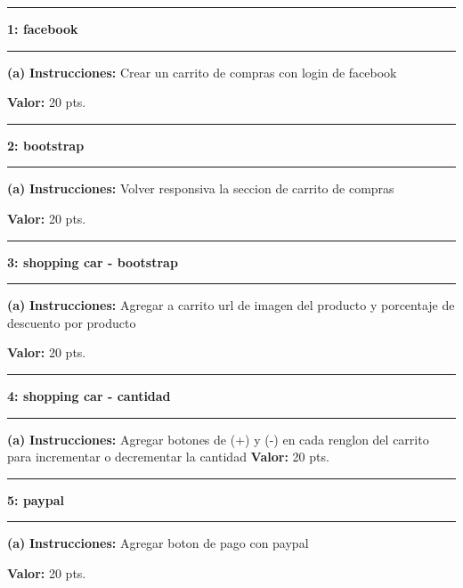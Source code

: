 \documentclass[11pt]{article}
\newcommand\question[2]{\vspace{.25in}\hrule\textbf{#1: #2}\vspace{.5em}\hrule\vspace{.10in}}
\renewcommand\part[1]{\vspace{.10in}\textbf{(#1)}}
\newcommand\algorithm{\vspace{.10in}\textbf{Instrucciones: }}
\newcommand\correctness{\vspace{.10in}\textbf{Valor: }}
\begin{document}
\raggedright

\newcommand\NAME{Adolfo Centeno}  
\newcommand\ADSOFTID{adsoft}     
\newcommand\HWNUM{2}              

\question{1}{facebook} 

\part{a} \algorithm  Crear un carrito de compras con login de facebook

\correctness 20 pts.

\question{2}{bootstrap}
\part{a} \algorithm Volver responsiva la seccion de carrito de compras

\correctness 20 pts.

\question{3}{shopping car - bootstrap}
\part{a} \algorithm Agregar a carrito url de imagen del producto y porcentaje de descuento por producto

\correctness 20 pts.


\question{4}{shopping car - cantidad}
\part{a} \algorithm Agregar botones de (+) y (-) en cada renglon del carrito para incrementar o decrementar la cantidad
\correctness 20 pts.


\question{5}{paypal}
\part{a} \algorithm Agregar boton de pago con paypal

\correctness 20 pts.
\end{document}
